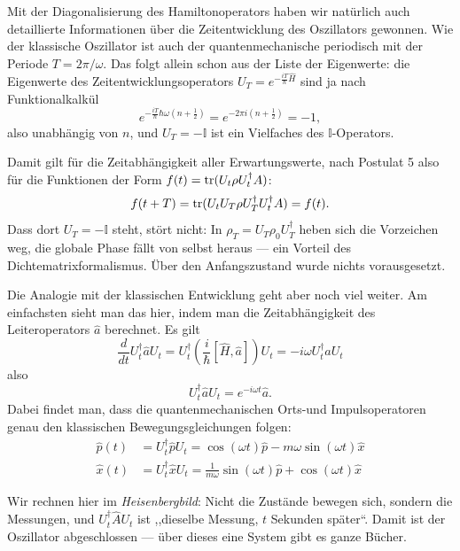 Mit der Diagonalisierung des Hamiltonoperators haben wir natürlich auch detaillierte Informationen über die Zeitentwicklung des Oszillators gewonnen. Wie der klassische Oszillator ist auch der quantenmechanische periodisch mit der Periode $T = 2\pi/\omega$. Das folgt allein schon aus der Liste der Eigenwerte: die Eigenwerte des Zeitentwicklungsoperators $U_T = e^{-\frac{iT}{\hbar} \widehat{H}}$ sind ja nach Funktionalkalkül
\begin{equation}
	e^{-\frac{iT}{\hbar} \hbar\omega(n+\frac12)} = e^{-2\pi i (n+\frac12)} = -1,
\end{equation}
also unabhängig von $n$, und $U_T = -\mathbb{I}$ ist ein Vielfaches des $\mathbb{I}$-Operators.

Damit gilt für die Zeitabhängigkeit aller Erwartungswerte, nach Postulat 5 also für die Funktionen der Form $f(t) = \operatorname{tr}(U_t \rho U_t^\dag A)$:
\begin{equation}
	f(t+T) = \operatorname{tr}(U_tU_T \rho U_T^\dag U_t^\dag A) =f(t).
\end{equation}	
Dass dort $U_T = -\mathbb{I}$ steht, stört nicht: In $\rho_T = U_T\rho_0U_T^\dag$ heben sich die Vorzeichen weg, die globale Phase fällt von selbst heraus --- ein Vorteil des Dichtematrixformalismus. Über den Anfangszustand wurde nichts vorausgesetzt.

Die Analogie mit der klassischen Entwicklung geht aber noch viel weiter. Am einfachsten sieht man das hier, indem man die Zeitabhängigkeit des Leiteroperators $\widehat{a}$ berechnet. Es gilt 
\begin{equation}
	\frac{d}{dt} U_t^\dag \widehat{a} U_t = U_t^\dag \left(\frac{i}{\hbar} [\widehat{H},\widehat{a}] \right) U_t = -i\omega U_t^\dag \widehat{a} U_t
\end{equation}
also
\begin{equation}
	U_t^\dag \widehat{a} U_t = e^{-i\omega t}\widehat{a}.
\end{equation}
Dabei findet man, dass die quantenmechanischen Orts-und Impulsoperatoren genau den klassischen Bewegungsgleichungen folgen:
\begin{equation}
	\begin{split}
		\widehat{p}(t) &= U_t^\dag \widehat{p} U_t  = \cos(\omega t) \widehat{p}  - m\omega\sin(\omega t) \widehat{x} \\
		\widehat{x}(t) &= U_t^\dag \widehat{x} U_t  = \frac{1}{m\omega}\sin(\omega t) \widehat{p}  + \cos(\omega t) \widehat{x}
	\end{split}
\end{equation}

Wir rechnen hier im \emph{Heisenbergbild}: Nicht die Zustände bewegen sich, sondern die Messungen, und $U_t^\dag \widehat{A} U_t$ ist ,,dieselbe Messung, $t$ Sekunden später``. Damit ist der Oszillator abgeschlossen --- über dieses eine System gibt es ganze Bücher.

